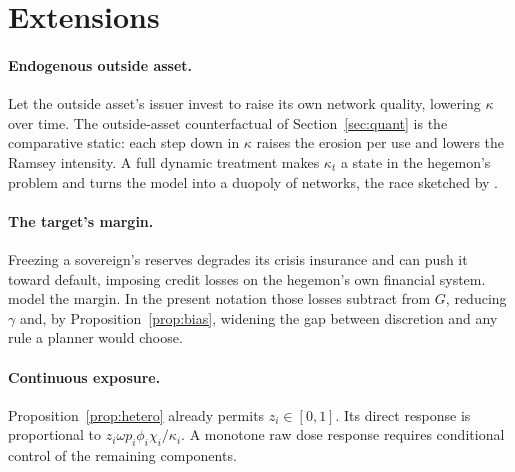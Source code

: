 \documentclass[11pt]{article}
\theoremstyle{definition}
\begin{document}
\section{Extensions}\label{app:extensions}

\paragraph{Endogenous outside asset.} Let the outside asset's issuer invest to raise its own network quality, lowering $\kappa$ over time. The outside-asset counterfactual of Section~\ref{sec:quant} is the comparative static: each step down in $\kappa$ raises the erosion per use and lowers the Ramsey intensity. A full dynamic treatment makes $\kappa_t$ a state in the hegemon's problem and turns the model into a duopoly of networks, the race sketched by \citet{FarhiMaggiori2018}.

\paragraph{The target's margin.} Freezing a sovereign's reserves degrades its crisis insurance and can push it toward default, imposing credit losses on the hegemon's own financial system. \citet{BianchiSosaPadilla2024JME} model the margin. In the present notation those losses subtract from $G$, reducing $\gamma$ and, by Proposition~\ref{prop:bias}, widening the gap between discretion and any rule a planner would choose.

\paragraph{Continuous exposure.} Proposition~\ref{prop:hetero} already permits $z_i\in[0,1]$. Its direct response is proportional to $z_i\omega p_i\phi_i\chi_i/\kappa_i$. A monotone raw dose response requires conditional control of the remaining components.

\clearpage
\printbibliography
\end{document}
